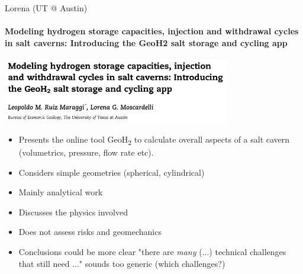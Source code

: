 \begin{frame}{Lorena (UT @ Austin)}
\framesubtitle{\cite{maraggi23} Modeling hydrogen storage capacities, injection and withdrawal cycles in salt caverns: Introducing the GeoH2 salt storage and cycling app}
\includegraphics[width=10cm]{png/maraggi23}
\begin{itemize}
\item Presents the online tool GeoH\textsubscript{2} to calculate overall aspects of a salt cavern (volumetrics, pressure, flow rate etc).
\item Considers simple geometries (spherical, cylindrical)
\item Mainly analytical work
\item Discusses the physics involved
\item Does not assess risks and geomechanics
\item Conclusions could be more clear "there are \textit{many} (...) technical challenges that still need ..." sounds too generic (which challenges?)
\end{itemize}
\end{frame}

